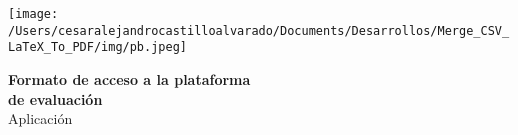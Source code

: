 \documentclass{letter}
\begin{document}

\begin{center}
    
\texttt{[image: /Users/cesaralejandrocastilloalvarado/Documents/Desarrollos/Merge\_CSV\_LaTeX\_To\_PDF/img/pb.jpeg]}

\vspace{3\baselineskip}
\textbf{{\LARGE Formato de acceso a la plataforma}} \\
\textbf{{\LARGE de evaluación}} \\
\vspace{.5\baselineskip}
{\LARGE Aplicación}


\end{center}
\end{document}
